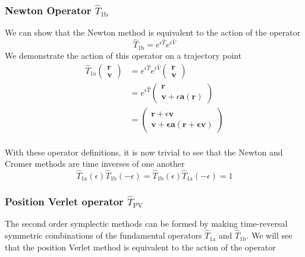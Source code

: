 \documentclass[8pt,a4paper]{article}
\begin{document}
	\subsubsection{Newton Operator $\hat{T}_\mathrm{1b}$}
	We can show that the Newton method is equivalent to the action of the operator
	\begin{equation}
		\hat{T}_\mathrm{1b} = e^{\epsilon \hat{T}} e^{\epsilon \hat{V}}
	\end{equation}
	We demonstrate the action of this operator on a trajectory point
	\begin{align}
		\hat{T}_\mathrm{1a}
		\begin{pmatrix}
			\mathbf{r} \\ \mathbf{v}
		\end{pmatrix}
		&= e^{\epsilon \hat{T}} e^{\epsilon \hat{V}}
		\begin{pmatrix}
			\mathbf{r} \\ \mathbf{v}
		\end{pmatrix} \nonumber \\
		&= e^{\epsilon \hat{T}}
		\begin{pmatrix}
			\mathbf{r} \\
			\mathbf{v} + \epsilon\mathbf{a}(\mathbf{r})
		\end{pmatrix} \nonumber \\
		&=
		\begin{pmatrix}
			\mathbf{r} + \epsilon \mathbf{v} \\
			\mathbf{v + \epsilon\mathbf{a}(\mathbf{r} + \epsilon \mathbf{v})}
		\end{pmatrix} \nonumber \\
	\end{align}
	
	With these operator definitions, it is now trivial to see that the Newton and Cromer methods are time inverses of one another
	\begin{equation}
		\hat{T}_\mathrm{1a}(\epsilon) \hat{T}_\mathrm{1b}(-\epsilon) = \hat{T}_\mathrm{1b}(\epsilon) \hat{T}_\mathrm{1a}(-\epsilon)  = 1
	\end{equation}
	
	\subsubsection{Position Verlet operator $\hat{T}_\mathrm{PV}$}
	The second order symplectic methods can be formed by making time-reversal symmetric combinations of the fundamental operators $\hat{T}_\mathrm{1a}$ and $\hat{T}_\mathrm{1b}$. We will see that the position Verlet method is equivalent to the action of the operator
	
\end{document}
